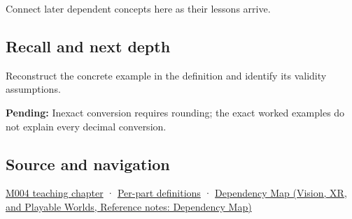 \hypertarget{appendix-6854d0e2218e-used-by}{}

Connect later dependent concepts here as their lessons arrive.

\subsection{Recall and next depth}\label{appendix-6854d0e2218e-recall-and-next-depth}

\hypertarget{appendix-6854d0e2218e-recall-and-next-depth}{}

Reconstruct the concrete example in the definition and identify its validity assumptions.

\textbf{Pending:} Inexact conversion requires rounding; the exact worked examples do not explain every decimal conversion.

\subsection{Source and navigation}\label{appendix-6854d0e2218e-source-and-navigation}

\hypertarget{appendix-6854d0e2218e-source-and-navigation}{}

\hyperref[01-foundations-i-ch001-a-stretching-ruler-for-real-valued-quantities]{M004 teaching chapter} · \hyperref[appendix-fd090d982a15-m004---parts-61-76]{Per-part definitions} · \href{../07-Vision-XR-and-Playable-Worlds/main.pdf\#nameddest=appendix-4ad47bdd269a}{Dependency Map (Vision, XR, and Playable Worlds, Reference notes: Dependency Map)}
